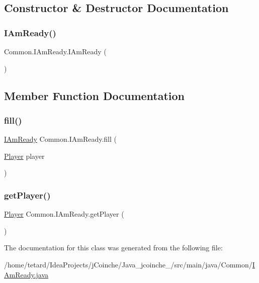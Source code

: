 \subsection{Constructor \& Destructor Documentation}
\mbox{\label{classCommon_1_1IAmReady_a852717589cc197c66d331b859c43d0ed}} 
\subsubsection{\texorpdfstring{I\+Am\+Ready()}{IAmReady()}}
{\footnotesize\ttfamily Common.\+I\+Am\+Ready.\+I\+Am\+Ready (\begin{DoxyParamCaption}{ }\end{DoxyParamCaption})\hspace{0.3cm}{\ttfamily [inline]}}



\subsection{Member Function Documentation}
\mbox{\label{classCommon_1_1IAmReady_afb8287607db59d4e6006d7c6739604fa}} 
\subsubsection{\texorpdfstring{fill()}{fill()}}
{\footnotesize\ttfamily \mbox{\hyperlink{classCommon_1_1IAmReady}{I\+Am\+Ready}} Common.\+I\+Am\+Ready.\+fill (\begin{DoxyParamCaption}\item[{\mbox{\hyperlink{classCommon_1_1Player}{Player}}}]{player }\end{DoxyParamCaption})\hspace{0.3cm}{\ttfamily [inline]}}

\mbox{\label{classCommon_1_1IAmReady_ad4ca10a7f3e52aa2f032d755d68e79d6}} 
\subsubsection{\texorpdfstring{get\+Player()}{getPlayer()}}
{\footnotesize\ttfamily \mbox{\hyperlink{classCommon_1_1Player}{Player}} Common.\+I\+Am\+Ready.\+get\+Player (\begin{DoxyParamCaption}{ }\end{DoxyParamCaption})\hspace{0.3cm}{\ttfamily [inline]}}



The documentation for this class was generated from the following file\+:\begin{DoxyCompactItemize}
\item 
/home/tetard/\+Idea\+Projects/j\+Coinche/\+Java\+\_\+jcoinche\+\_/src/main/java/\+Common/\mbox{\hyperlink{IAmReady_8java}{I\+Am\+Ready.\+java}}\end{DoxyCompactItemize}
